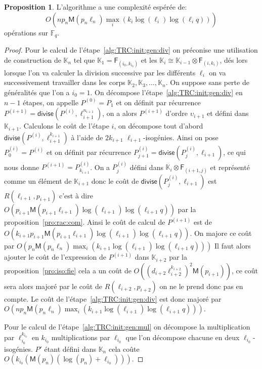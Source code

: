 \documentclass[10pt,a4paper]{book}
\theoremstyle{plain}
\theoremstyle{definition}
\theoremstyle{definition}
\theoremstyle{definition}
\newtheorem{prop}[thm]{Proposition}
\theoremstyle{definition}
\theoremstyle{remark}
\theoremstyle{remark}
\theoremstyle{definition}
\begin{document}
\begin{prop}
L'algorithme a une complexité espérée de:
\[
O(n p_{n}\mathsf{M}(p_{n}\ell_{n})\max_i(k_{i}\log(\ell_{i})\log(\ell_{i}q)))
\] 
opérations sur $\mathbb{F}_q$.
\end{prop}

\begin{proof}
Pour le calcul de l'étape~\ref{alg:TRC:init:gen:div} on préconise une 
utilisation de construction de $\mathbb{K}_n$ tel que $\mathbb{K}_1=
\mathsf{F}_{(i_0,k_{i_0})}$ et les 
$\mathbb{K}_i \cong \mathbb{K}_{i-1} \otimes \mathsf{F}_{(i,k_i)}$, dés lors lorsque 
l'on va calculer la division successive par les différents $\ell_i$ on va 
successivement travailler dans les corps 
$\mathbb{K}_2, \mathbb{K}_3, \dots, \mathbb{K}_n$. On suppose sans perte 
de généralités que l'on a $i_0=1$. On décompose 
l'étape~\ref{alg:TRC:init:gen:div} en $n-1$ 
étapes, on appelle $P^{(0)}=P_{1}$ et on définit par récurrence 
$P^{(i+1)}=\mathsf{divise}(P^{(i)},\ell_{i+1}^{n_{i+1}})$, on a alors 
$P^{(i+1)}$ d'ordre $\upsilon_{i+1}$ et défini dans $\mathbb{K}_{i+1}$. 
Calculons le coût de l'étape $i$, on décompose tout d'abord 
$\mathsf{divise}(P^{(i)},\ell_{i+1}^{k_{i+1}})$ à l'aide de $2k_{i+1}$ 
$\ell_{i+1}$-isogénies. Ainsi on pose $P^{(i)}_0=P^{(i)}$ et on définit par 
récurrence $P^{(i)}_{j+1}=\mathsf{divise}(P^{(i)}_{j},\ell_{i+1})$, ce qui nous
 donne $P^{(i+1)}=P^{(i)}_{k_{i+1}}$. On a $P^{(i)}_{j}$ défini dans 
 $\mathbb{K}_i\otimes \mathsf{F}_{(i+1,j)}$ et représenté comme un élément de 
 $\mathbb{K}_{i+1}$ donc le coût de  $\mathsf{divise}(P^{(i)}_{j},\ell_{i+1})$ 
 est $R(\ell_{i+1},p_{i+1})$ c'est à dire 
 $O(p_{i+1} \mathsf{M}(p_{i+1}  \ell_{i+1})\log(\ell_{i+1})\log(\ell_{i+1}q))$
 par la proposition~\ref{pro:rac:com}. Ainsi le coût de calcul de $P^{(i+1)}$ 
 est de 
 $O(k_{i+1}p_{i+1} \mathsf{M}(p_{i+1}  \ell_{i+1})\log(\ell_{i+1})\log(\ell_{i+1}q))$.
 On majore ce coût par $O(p_{n}\mathsf{M}(p_{n}\ell_{n})\max_i(k_{i+1}\log(\ell_{i+1})\log(\ell_{i+1}q)))$
 Il faut alors ajouter le coût de l'expression de $P^{(i+1)}$ dans 
 $\mathbb{K}_{i+2}$ par la proposition~\ref{pro:iso:fie}
 cela a un coût de $O((d_{i+2}\ell_{i+2}^{k_{i+2}})^2\mathsf{M}(p_{i+1}))$,
 ce coût sera alors majoré par le coût de $R(\ell_{i+2},p_{i+2})$ on ne le 
 prend donc pas en compte. 
 Le coût de l'étape~\ref{alg:TRC:init:gen:div} est donc majoré par 
 $O(n p_{n}\mathsf{M}(p_{n}\ell_{n})\max_i(k_{i+1}\log(\ell_{i+1})\log(\ell_{i+1}q)))$. 

Pour le calcul de l'étape~\ref{alg:TRC:init:gen:mul} on décompose la 
multiplication par $\ell_{i_0}^{k_{i_0}}$ en $k_{i_0}$ multiplications par 
$\ell_{i_0}$ que l'on décompose chacune en deux $\ell_{i_0}$-isogénies. $P'$ 
étant défini dans $\mathbb{K}_{n}$ cela coûte 
$O(k_{i_0}(\mathsf{M}(p_n)(\log(p_n)+\ell_{i_0})))$.


\end{proof}
\end{document}
